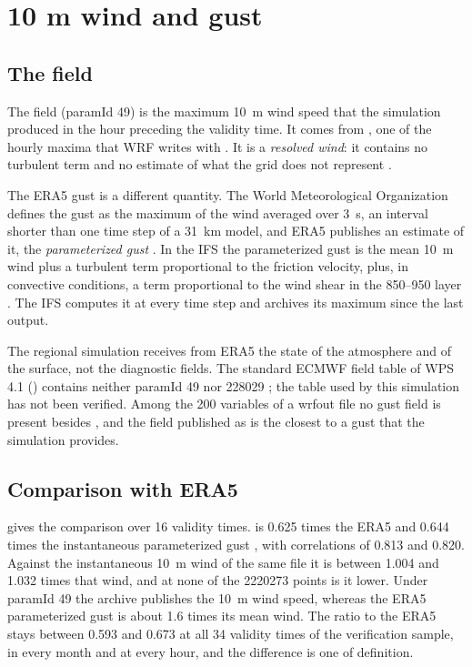 \chapter{10 m wind and gust}
\label{cap:raffica}

\section{The \texorpdfstring{}{10fg} field}
\label{sec:10fg}

The  field (paramId 49) is the maximum \SI{10}{m} wind speed that the simulation
produced in the hour preceding the validity time. It comes from , one of the hourly
maxima that WRF writes with . It is a \emph{resolved wind}: it contains no
turbulent term and no estimate of what the grid does not represent \parencite{issue50}.

The ERA5 gust is a different quantity. The World Meteorological Organization defines the gust as
the maximum of the wind averaged over \SI{3}{s}, an interval shorter than one time step of a
\SI{31}{km} model, and ERA5 publishes an estimate of it, the \emph{parameterized gust}
\parencite{paramdb}. In the IFS the parameterized gust is the mean \SI{10}{m} wind plus a turbulent
term proportional to the friction velocity, plus, in convective conditions, a term proportional to
the wind shear in the \SIrange{850}{950}{\hPa} layer \parencite[sec.~3.10.4, eq.~3.99]{ifs41r2p4}. The
IFS computes it at every time step and archives its maximum since the last output.

The regional simulation receives from ERA5 the state of the atmosphere and of the surface, not the
diagnostic fields. The standard ECMWF field table of WPS 4.1 () contains
neither paramId 49 nor 228029 \parencite{wps41}; the table used by this simulation has not been
verified. Among the 200 variables of a wrfout file no gust field is present besides
, and the field published as  is the closest to a gust that the
simulation provides.

\section{Comparison with ERA5}
\label{sec:10fg-era5}

 gives the comparison over 16 validity times.  is \num{0.625} times the
ERA5  and \num{0.644} times the instantaneous parameterized gust , with
correlations of \num{0.813} and \num{0.820}. Against the instantaneous \SI{10}{m} wind of the same
file it is between \num{1.004} and \num{1.032} times that wind, and at none of the \num{2220273} points is it
lower. Under paramId 49 the archive publishes the \SI{10}{m} wind speed, whereas the ERA5
parameterized gust is about \num{1.6} times its mean wind. The ratio to the ERA5  stays
between \num{0.593} and \num{0.673} at all 34 validity times of the verification sample, in every
month and at every hour, and the difference is one of definition.

